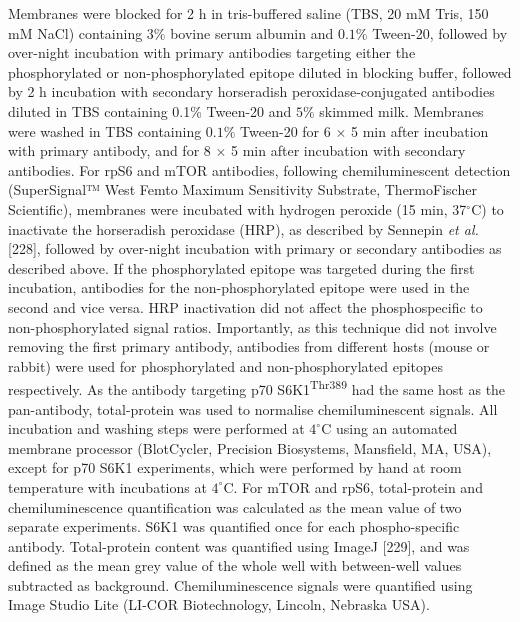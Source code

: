 \documentclass[twoside,10pt]{gihclass} %
\begin{document}
Membranes were blocked for 2 h in tris-buffered saline (TBS, 20 mM Tris, 150 mM NaCl) containing \(3\%\) bovine serum albumin and \(0.1\%\) Tween-20, followed by over-night incubation with primary antibodies targeting either the phosphorylated or non-phosphorylated epitope diluted in blocking buffer, followed by 2 h incubation with secondary horseradish peroxidase-conjugated antibodies diluted in TBS containing 0.1\% Tween-20 and \(5\%\) skimmed milk. Membranes were washed in TBS containing \(0.1\%\) Tween-20 for 6 \(\times\) 5 min after incubation with primary antibody, and for 8 \(\times\) 5 min after incubation with secondary antibodies. For rpS6 and mTOR antibodies, following chemiluminescent detection (SuperSignal™ West Femto Maximum Sensitivity Substrate, ThermoFischer Scientific), membranes were incubated with hydrogen peroxide (15 min, 37\(^{\circ}\)C) to inactivate the horseradish peroxidase (HRP), as described by Sennepin \emph{et al.} {[}228{]}, followed by over-night incubation with primary or secondary antibodies as described above. If the phosphorylated epitope was targeted during the first incubation, antibodies for the non-phosphorylated epitope were used in the second and vice versa. HRP inactivation did not affect the phosphospecific to non-phosphorylated signal ratios. Importantly, as this technique did not involve removing the first primary antibody, antibodies from different hosts (mouse or rabbit) were used for phosphorylated and non-phosphorylated epitopes respectively. As the antibody targeting p70 S6K1\textsuperscript{Thr389} had the same host as the pan-antibody, total-protein was used to normalise chemiluminescent signals. All incubation and washing steps were performed at \(4^{\circ}\)C using an automated membrane processor (BlotCycler, Precision Biosystems, Mansfield, MA, USA), except for p70 S6K1 experiments, which were performed by hand at room temperature with incubations at \(4^{\circ}\)C. For mTOR and rpS6, total-protein and chemiluminescence quantification was calculated as the mean value of two separate experiments. S6K1 was quantified once for each phospho-specific antibody. Total-protein content was quantified using ImageJ {[}229{]}, and was defined as the mean grey value of the whole well with between-well values subtracted as background. Chemiluminescence signals were quantified using Image Studio Lite (LI-COR Biotechnology, Lincoln, Nebraska USA).
\end{document}
